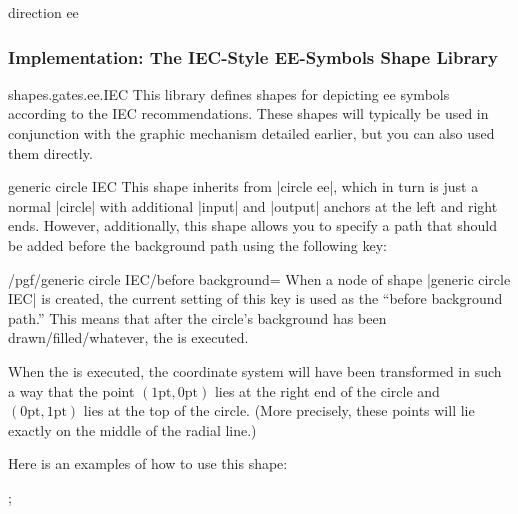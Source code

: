 \begin{shape}{direction ee}
\begin{codeexample}[]
\end{codeexample}
\end{shape}


\subsubsection{Implementation: The IEC-Style EE-Symbols Shape Library}

\begin{pgflibrary}{shapes.gates.ee.IEC}
  This library defines shapes for depicting ee symbols according to
  the IEC recommendations. These shapes will typically be
  used in conjunction with the graphic mechanism detailed earlier, but
  you can also used them directly.
\end{pgflibrary}

\begin{shape}{generic circle IEC}
  This shape inherits from |circle ee|, which in turn is just a normal
  |circle| with additional |input| and |output| anchors at the left
  and right ends. However, additionally, this shape allows you to
  specify a path that should be added before the background path using
  the following key:
  \begin{key}{/pgf/generic circle IEC/before background=}
    When a node of shape |generic circle IEC| is created, the current
    setting of this key is used as the ``before background path.''
    This means that after the circle's background has been
    drawn/filled/whatever, the  is executed.

    When the  is executed, the coordinate system will have
    been transformed in such a way that the point
    $(1\mathrm{pt},0\mathrm{pt})$ lies at the right end of the circle
    and $(0\mathrm{pt},1\mathrm{pt})$ lies at the top of the
    circle. (More precisely, these points will lie exactly on the
    middle of the radial line.)
  \end{key}
  Here is an examples of how to use this shape:
\begin{codeexample}[]
\tikz {};
\end{codeexample}
\end{shape}


